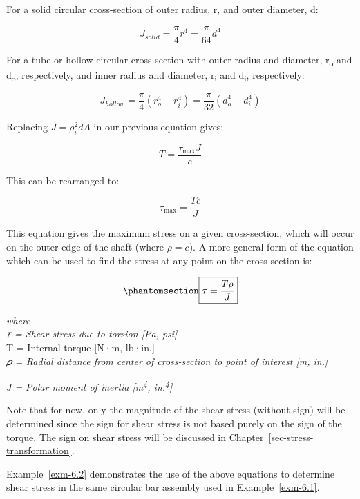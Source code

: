 \documentclass[
  letterpaper,
  DIV=11,
  numbers=noendperiod]{scrreprt}
\theoremstyle{definition}
\theoremstyle{remark}
\begin{document}
For a solid circular cross-section of outer radius, r, and outer
diameter, d:

\[
J_{solid}=\frac{\pi}{4} r^4=\frac{\pi}{64} d^4
\]

For a tube or hollow circular cross-section with outer radius and
diameter, r\textsubscript{o} and d\textsubscript{o}, respectively, and
inner radius and diameter, r\textsubscript{i} and d\textsubscript{i},
respectively:

\[
J_{hollow}=\frac{\pi}{4}\left(r_o^4-r_i^4\right)=\frac{\pi}{32}\left(d_o^4-d_i^4\right)
\]

Replacing \(J=\rho^2_idA\) in our previous equation gives:

\[
T=\frac{\tau_{\max } J}{c}
\]

This can be rearranged to:

\[
\tau_{\max }=\frac{T c}{J}
\]

This equation gives the maximum stress on a given cross-section, which
will occur on the outer edge of the shaft (where \(\rho=c\)). A more
general form of the equation which can be used to find the stress at any
point on the cross-section is:

\begin{equation}\phantomsection\label{eq-6.1}{
\boxed{\tau=\frac{T \rho}{J}}
}\end{equation}

\emph{where}\\
\emph{𝜏 = Shear stress due to torsion {[}Pa, psi{]}}\\
T = Internal torque {[}N·m, lb·in.{]}\\
\emph{𝜌 = Radial distance from center of cross-section to point of
interest {[}m, in.{]}}

\emph{J = Polar moment of inertia {[}m\textsuperscript{4},
in.\textsuperscript{4}{]}}

Note that for now, only the magnitude of the shear stress (without sign)
will be determined since the sign for shear stress is not based purely
on the sign of the torque. The sign on shear stress will be discussed in
Chapter~\ref{sec-stress-transformation}.

Example~\ref{exm-6.2} demonstrates the use of the above equations to
determine shear stress in the same circular bar assembly used in
Example~\ref{exm-6.1}.
\end{document}
